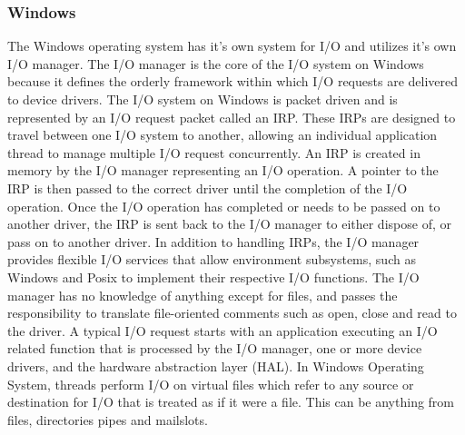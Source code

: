 \documentclass[10pt,draftclsnofoot,onecolumn,journal,compsoc]{IEEEtran}
\begin{document}
\subsubsection*{Windows}
The Windows operating system has it's own system for I/O and utilizes it's own I/O manager. The I/O manager is the core of the I/O system on Windows because it defines the orderly framework within which I/O requests are delivered to device drivers. \cite{Wini}
The I/O system on Windows is packet driven and is represented by an I/O request packet called an IRP. These IRPs are designed to travel between one I/O system to another, allowing an individual application thread to manage multiple I/O request concurrently. An IRP is created in memory by the I/O manager representing an I/O operation. A pointer to the IRP is then passed to the correct driver until the completion of the I/O operation. Once the I/O operation has completed or needs to be passed on to another driver, the IRP is sent back to the I/O manager to either dispose of, or pass on to another driver. In addition to handling IRPs, the I/O manager provides flexible I/O services that allow environment subsystems, such as Windows and Posix to implement their respective I/O functions. The I/O manager has no knowledge of anything except for files, and passes the responsibility to translate file-oriented comments such as open, close and read to the driver. A typical I/O request starts with an application executing an I/O related function that is processed by the I/O manager, one or more device drivers, and the hardware abstraction layer (HAL). In Windows Operating System, threads perform I/O on virtual files which refer to any source or destination for I/O that is treated as if it were a file. This can be anything from files, directories pipes and mailslots.
\end{document}
